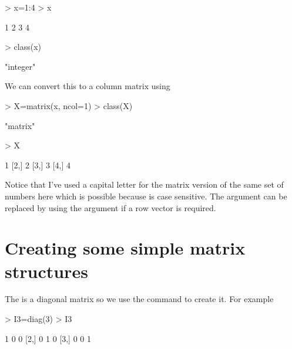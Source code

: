 \begin{Schunk}
\begin{Sinput}
> x=1:4 
> x 
\end{Sinput}
\begin{Soutput}
[1] 1 2 3 4
\end{Soutput}
\begin{Sinput}
> class(x) 
\end{Sinput}
\begin{Soutput}
[1] "integer"
\end{Soutput}
\end{Schunk}

We can convert this to a column matrix using 

\begin{Schunk}
\begin{Sinput}
> X=matrix(x, ncol=1) 
> class(X) 
\end{Sinput}
\begin{Soutput}
[1] "matrix"
\end{Soutput}
\begin{Sinput}
> X 
\end{Sinput}
\begin{Soutput}
     [,1]
[1,]    1
[2,]    2
[3,]    3
[4,]    4
\end{Soutput}
\end{Schunk}

Notice that I've used a capital letter for the matrix version of the same set of numbers here which is possible because \R{} is case sensitive. The  argument can be replaced by using the  argument if a row vector is required. 
 
\section{Creating some simple matrix structures} 
 
The  is a diagonal matrix so we use the  command to create it. For example 

\begin{Schunk}
\begin{Sinput}
> I3=diag(3) 
> I3 
\end{Sinput}
\begin{Soutput}
     [,1] [,2] [,3]
[1,]    1    0    0
[2,]    0    1    0
[3,]    0    0    1
\end{Soutput}
\end{Schunk}


